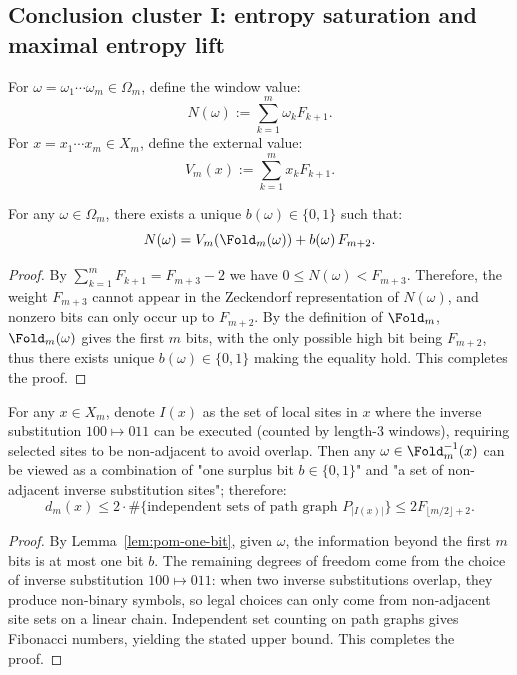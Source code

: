 \subsection{Conclusion cluster I: entropy saturation and maximal entropy lift}\label{subsec:pom-entropy-maxent}
\begin{definition}\label{def:pom-window-value}
For $\omega=\omega_1\cdots\omega_m\in\Omega_m$, define the window value:
\[
N(\omega):=\sum_{k=1}^m \omega_k F_{k+1}.
\]
For $x=x_1\cdots x_m\in X_m$, define the external value:
\[
V_m(x):=\sum_{k=1}^m x_k F_{k+1}.
\]
\end{definition}

\begin{lemma}\label{lem:pom-one-bit}
For any $\omega\in\Omega_m$, there exists a unique $b(\omega)\in\{0,1\}$ such that:
\[
N(\omega)=V_m(\Fold_m(\omega)) + b(\omega)\,F_{m+2}.
\]
\end{lemma}
\begin{proof}
By $\sum_{k=1}^m F_{k+1}=F_{m+3}-2$ we have $0\le N(\omega)<F_{m+3}$. Therefore, the weight $F_{m+3}$ cannot appear in the Zeckendorf representation of $N(\omega)$, and nonzero bits can only occur up to $F_{m+2}$. By the definition of $\Fold_m$, $\Fold_m(\omega)$ gives the first $m$ bits, with the only possible high bit being $F_{m+2}$, thus there exists unique $b(\omega)\in\{0,1\}$ making the equality hold. This completes the proof.
\end{proof}

\begin{proposition}\label{prop:pom-fiber-decompose}
For any $x\in X_m$, denote $I(x)$ as the set of local sites in $x$ where the inverse substitution $100\mapsto 011$ can be executed (counted by length-$3$ windows), requiring selected sites to be non-adjacent to avoid overlap. Then any $\omega\in\Fold_m^{-1}(x)$ can be viewed as a combination of "one surplus bit $b\in\{0,1\}$" and "a set of non-adjacent inverse substitution sites"; therefore:
\[
d_m(x)\le 2\cdot \#\{\text{independent sets of path graph }P_{|I(x)|}\}
\le 2F_{\lfloor m/2\rfloor+2}.
\]
\end{proposition}
\begin{proof}
By Lemma~\ref{lem:pom-one-bit}, given $\omega$, the information beyond the first $m$ bits is at most one bit $b$. The remaining degrees of freedom come from the choice of inverse substitution $100\mapsto 011$: when two inverse substitutions overlap, they produce non-binary symbols, so legal choices can only come from non-adjacent site sets on a linear chain. Independent set counting on path graphs gives Fibonacci numbers, yielding the stated upper bound. This completes the proof.
\end{proof}

